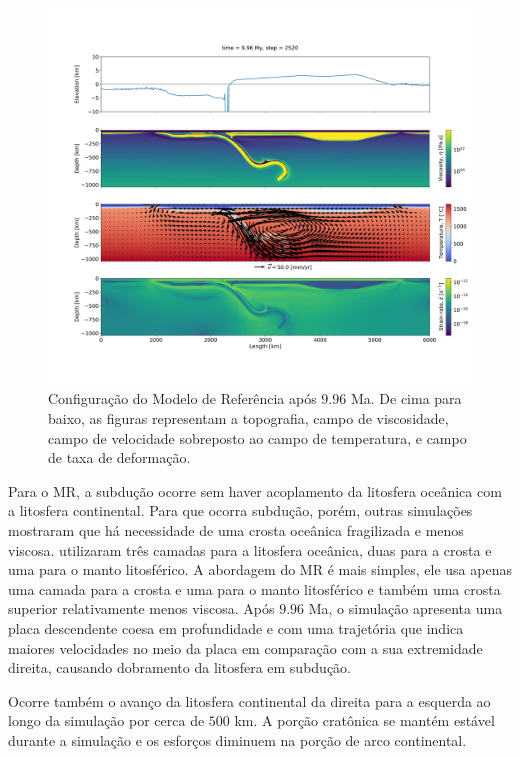 \begin{figure}
    \centering
    \includegraphics[trim={5cm 14cm 2cm 12cm}, clip, width=1.0 \textwidth]{fig/strak_32-11.png}
    \caption{Configuração do Modelo de Referência após $9.96$ Ma. De cima para baixo, as figuras representam a topografia, campo de viscosidade, campo de velocidade sobreposto ao campo de temperatura, e campo de taxa de deformação.}
    \label{fig:strak_32-11}
\end{figure}

Para o MR, a subdução ocorre sem haver acoplamento da litosfera oceânica com a litosfera continental. Para que ocorra subdução, porém, outras simulações mostraram que há necessidade de uma crosta oceânica fragilizada e menos viscosa. \citet{strak2021thermo} utilizaram três camadas para a litosfera oceânica, duas para a crosta e uma para o manto litosférico. A abordagem do MR é mais simples, ele usa apenas uma camada para a crosta e uma para o manto litosférico e também uma crosta superior relativamente menos viscosa. Após $9.96$ Ma, o simulação apresenta uma placa descendente coesa em profundidade e com uma trajetória que indica maiores velocidades no meio da placa em comparação com a sua extremidade direita, causando dobramento da litosfera em subdução.

Ocorre também o avanço da litosfera continental da direita para a esquerda ao longo da simulação por cerca de $500$ km. A porção cratônica se mantém estável durante a simulação e os esforços diminuem na porção de arco continental.

